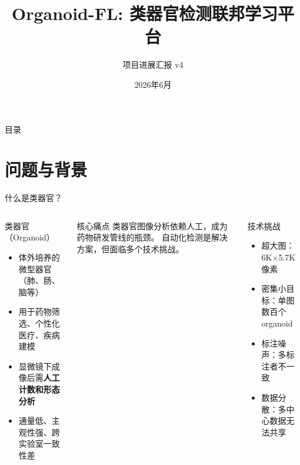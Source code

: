 \documentclass[aspectratio=169, 10pt]{beamer}
\title[Organoid-FL]{Organoid-FL: 类器官检测联邦学习平台}
\subtitle{项目进展汇报 v4}
\date{2026年6月}
\begin{document}
\begin{frame}[plain]
  \titlepage
\end{frame}

\begin{frame}{目录}
  \tableofcontents
\end{frame}

\section{问题与背景}

\begin{frame}{什么是类器官？}
  \begin{columns}[T]
    \begin{block}{类器官（Organoid）}
      \begin{itemize}
        \item 体外培养的微型器官（肺、肠、脑等）
        \item 用于药物筛选、个性化医疗、疾病建模
        \item 显微镜下成像后需\textbf{人工计数和形态分析}
        \item 通量低、主观性强、跨实验室一致性差
      \end{itemize}
    \end{block}
    \vspace{0em}
    \begin{alertblock}{核心痛点}
      类器官图像分析依赖人工，成为药物研发管线的瓶颈。
      自动化检测是解决方案，但面临多个技术挑战。
    \end{alertblock}
    \begin{block}{技术挑战}
      \begin{itemize}
        \item \alert{超大图}：6K$\times$5.7K 像素
        \item \alert{密集小目标}：单图数百个 organoid
        \item \alert{标注噪声}：多标注者不一致
        \item \alert{数据分散}：多中心数据无法共享
      \end{itemize}
    \end{block}
  \end{columns}
\end{frame}
\end{document}
